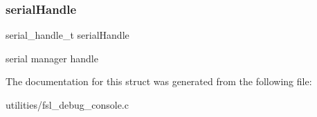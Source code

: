 \subsubsection{\texorpdfstring{serialHandle}{serialHandle}}
{\footnotesize\ttfamily serial\+\_\+handle\+\_\+t serial\+Handle}

serial manager handle 

The documentation for this struct was generated from the following file\+:\begin{DoxyCompactItemize}
\item 
utilities/fsl\+\_\+debug\+\_\+console.\+c\end{DoxyCompactItemize}
